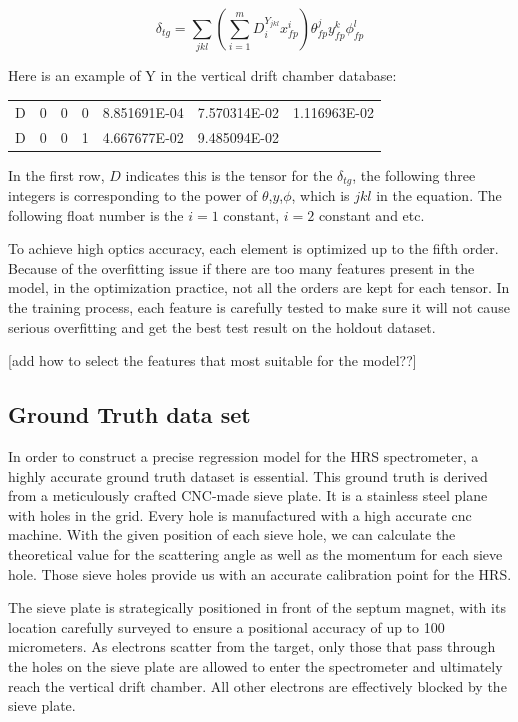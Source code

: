 \begin{equation}
    \delta_{tg} = \sum_{jkl}(\sum^m_{i=1}D_i^{Y_{jkl}}x^i_{fp})\theta^j_{fp}y^k_{fp}\phi^l_{fp}
\end{equation}

Here is an example of Y in the vertical drift chamber database:

\begin{center}
    \begin{tabular}{c c c c c c c }
        D& 0& 0& 0&  8.851691E-04& 7.570314E-02& 1.116963E-02\\
        D& 0& 0& 1&  4.667677E-02& 9.485094E-02&
    \end{tabular}    
\end{center}

In the first row, $D$ indicates this is the tensor for the $\delta_{tg}$, the following three integers is corresponding to the power of $\theta$,$y$,$\phi$, which is $jkl$ in the equation. The following float number is the $i=1$ constant, $i=2$ constant and etc. 


To achieve high optics accuracy, each element is optimized up to the fifth order. Because of the overfitting issue if there are too many features present in the model, in the optimization practice, not all the orders are kept for each tensor. In the training process, each feature is carefully tested to make sure it will not cause serious overfitting and get the best test result on the holdout dataset. 

[add how to select the features that most suitable for the model??]

\subsection{Ground Truth data set}

In order to construct a precise regression model for the HRS spectrometer, a highly accurate ground truth dataset is essential. This ground truth is derived from a meticulously crafted CNC-made sieve plate. It is a stainless steel plane with holes in the grid. Every hole is manufactured with a high accurate cnc machine. With the given position of each sieve hole, we can calculate the theoretical value for the scattering angle as well as the momentum for each sieve hole. Those sieve holes provide us with an accurate calibration point for the HRS. 

The sieve plate is strategically positioned in front of the septum magnet, with its location carefully surveyed to ensure a positional accuracy of up to 100 micrometers. As electrons scatter from the target, only those that pass through the holes on the sieve plate are allowed to enter the spectrometer and ultimately reach the vertical drift chamber. All other electrons are effectively blocked by the sieve plate.


